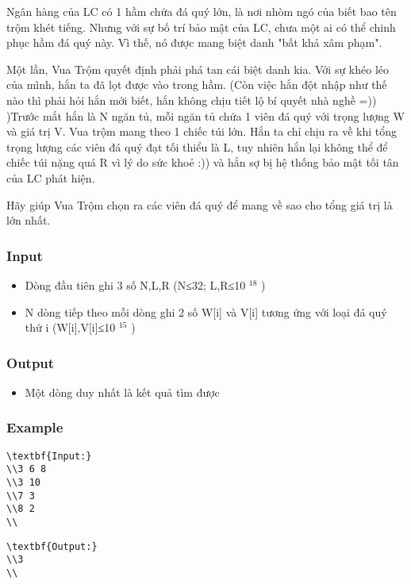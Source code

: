 



   Ngân hàng của LC có 1 hầm chứa đá quý lớn, là nơi nhòm ngó của biết bao tên trộm khét tiếng. Nhưng với sự bố trí bảo mật của LC, chưa một ai có thể chinh phục hầm đá quý này. Vì thế, nó được mang biệt danh "bất khả xâm phạm".  

   Một lần, Vua Trộm quyết định phải phá tan cái biệt danh kia. Với sự khéo léo của mình, hắn ta đã lọt được vào trong hầm. (Còn việc hắn đột nhập như thế nào thì phải hỏi hắn mới biết, hắn không chịu tiết lộ bí quyết nhà nghề =)) )Trước mắt hắn là N ngăn tủ, mỗi ngăn tủ chứa 1 viên đá quý với trọng lượng W và giá trị V. Vua trộm mang theo 1 chiếc túi lớn. Hắn ta chỉ chịu ra về khi tổng trọng lượng các viên đá quý đạt tối thiểu là L, tuy nhiên hắn lại không thể để chiếc túi nặng quá R vì lý do sức khoẻ :)) và hắn sợ bị hệ thống bảo mật tối tân của LC phát hiện.  

   Hãy giúp Vua Trộm chọn ra các viên đá quý để mang về sao cho tổng giá trị là lớn nhất.  

\subsubsection{   Input  }
\begin{itemize}
	\item     Dòng đầu tiên ghi 3 số N,L,R (N≤32; L,R≤10    $^     18    $    )   
	\item     N dòng tiếp theo mỗi dòng ghi 2 số W[i] và V[i] tương ứng với loại đá quý thứ i (W[i],V[i]≤10    $^     15    $    )   
\end{itemize}

\subsubsection{   Output  }
\begin{itemize}
	\item     Một dòng duy nhất là kết quả tìm được   
\end{itemize}

\subsubsection{   Example  }
\begin{verbatim}
\textbf{Input:}
\\3 6 8
\\3 10
\\7 3
\\8 2
\\\end{verbatim}
\begin{itemize}
\end{itemize}
\begin{verbatim}
\textbf{Output:}
\\3
\\\end{verbatim}